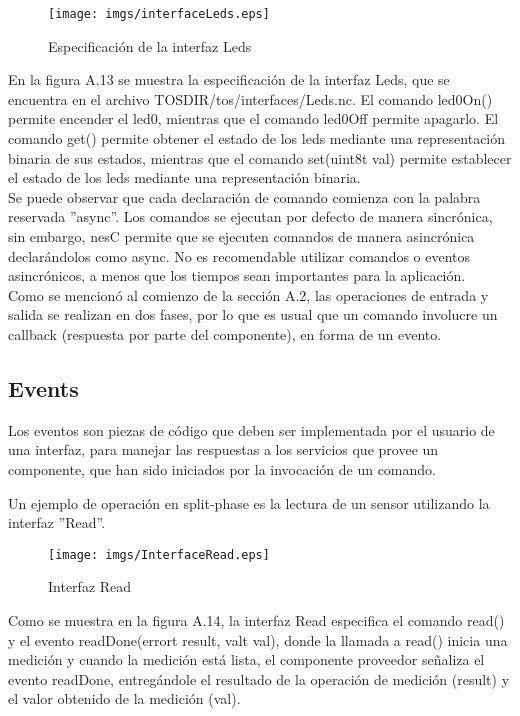 \begin{figure}[H]
	\centering
 	\texttt{[image: imgs/interfaceLeds.eps]} 
 	\caption{Especificación de la interfaz Leds}
\end{figure}

En la figura A.13 se muestra la especificación de la interfaz Leds, que se encuentra en el archivo TOS\textunderscore DIR/tos/interfaces/Leds.nc.  El comando led0On() permite encender el led0, mientras que el comando led0Off permite apagarlo. El comando get() permite obtener el estado de los leds mediante una representación binaria de sus estados, mientras que el comando set(uint8\textunderscore t val) permite establecer el estado de los leds mediante una representación binaria.\\

Se puede observar que cada declaración de comando comienza con la palabra reservada ''async''. Los comandos se ejecutan por defecto de manera sincrónica, sin embargo, nesC permite que se ejecuten comandos de manera asincrónica declarándolos como async. No es recomendable utilizar comandos o eventos asincrónicos, a menos que los tiempos sean importantes para la aplicación.\\

Como se mencionó al comienzo de la sección A.2, las operaciones de entrada y salida se realizan en dos fases, por lo que es usual que un comando involucre un callback (respuesta por parte del componente), en forma de un evento.

\subsection{Events}
Los eventos son piezas de código que deben ser implementada por el usuario de una interfaz, para manejar las respuestas a los servicios que provee un componente, que han sido iniciados por la invocación de un comando.

Un ejemplo de operación en split-phase es la lectura de un sensor utilizando la interfaz ''Read''.

\begin{figure}[H]
	\centering
 	\texttt{[image: imgs/InterfaceRead.eps]} 
 	\caption{Interfaz Read}
\end{figure}

Como se muestra en la figura A.14, la interfaz Read especifica el comando read() y el evento readDone(error\textunderscore t result, val\textunderscore t val), donde la llamada a read() inicia una medición y cuando la medición está lista, el componente proveedor señaliza el evento readDone, entregándole el resultado de la operación de medición (result)  y el valor obtenido de la medición (val).\\ 

